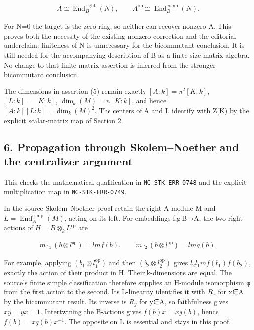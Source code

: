 \documentclass[11pt]{article}
\begin{document}
\[\begin{gathered}
A \cong \operatorname{End}_{B}^{\mathrm{right}}(N),\qquad A^{\mathrm{op}} \cong \operatorname{End}_{B}^{\mathrm{comp}}(N).
\end{gathered}\]

For N=0 the target is the zero ring, so neither can recover nonzero A. This proves both the necessity of the existing nonzero correction and the editorial underclaim: finiteness of N is unnecessary for the bicommutant conclusion. It is still needed for the accompanying description of B as a finite-size matrix algebra. No change to that finite-matrix assertion is inferred from the stronger bicommutant conclusion.

The dimensions in assertion (5) remain exactly \([A:k]=n^{2}[K:k]\), \([L:k]=[K:k]\), \(\operatorname{dim}_{k}(M)=n[K:k]\), and hence \([A:k][L:k]=\operatorname{dim}_{k}(M)^{2}\). The centers of A and L identify with Z(K) by the explicit scalar-matrix map of Section 2.

\subsection{6. Propagation through Skolem--Noether and the centralizer argument}\label{propagation-through-skolemnoether-and-the-centralizer-argument}

This checks the mathematical qualification in \texttt{MC-STK-ERR-0748} and the explicit multiplication map in \texttt{MC-STK-ERR-0749}.

In the source Skolem--Noether proof retain the right A-module M and \(L=\operatorname{End}_{A}^{\mathrm{comp}}(M)\), acting on its left. For embeddings f,g:B→A, the two right actions of \(H=B\otimes _{k} L^{\mathrm{op}}\) are

\[\begin{gathered}
m\cdot _{1}(b\otimes l^{\mathrm{op}})=l m f(b),\qquad m\cdot _{2}(b\otimes l^{\mathrm{op}})=l m g(b).
\end{gathered}\]

For example, applying \((b_{1}\otimes l_{1}^{\mathrm{op}})\) and then \((b_{2}\otimes l_{2}^{\mathrm{op}})\) gives \(l_{2} l_{1} m f(b_{1})f(b_{2})\), exactly the action of their product in H. Their k-dimensions are equal. The source's finite simple classification therefore supplies an H-module isomorphism φ from the first action to the second. Its L-linearity identifies it with \(R_{x}\) for x∈A by the bicommutant result. Its inverse is \(R_{y}\) for y∈A, so faithfulness gives \(xy=yx=1\). Intertwining the B-actions gives \(f(b)x=xg(b)\), hence \(f(b)=xg(b)x^{-1}\). The opposite on L is essential and stays in this proof.
\end{document}
